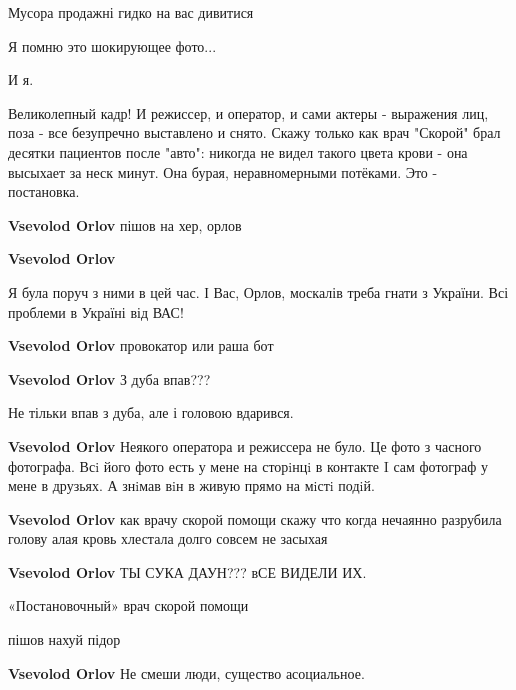 
 
 
 
 

Мусора продажні гидко на вас дивитися

Я помню это шокирующее фото...

И я.


Великолепный кадр! И режиссер, и оператор, и сами актеры - выражения лиц,
поза - все безупречно выставлено и снято. Скажу только как врач "Скорой" брал
десятки пациентов после "авто": никогда не видел такого цвета крови - она
высыхает за неск минут. Она бурая, неравномерными потёками. Это - постановка.

\begin{itemize} %
\textbf{Vsevolod Orlov} пішов на хер, орлов

\textbf{Vsevolod Orlov} 

Я була поруч з ними в цей час. І Вас, Орлов, москалів треба гнати з України.
Всі проблеми в Україні від ВАС!

\textbf{Vsevolod Orlov} провокатор или раша бот

\textbf{Vsevolod Orlov} З дуба впав???

Не тільки впав з дуба, але і головою вдарився.

\textbf{Vsevolod Orlov} Неякого оператора и режиссера не було. Це фото з часного фотографа. Всi його фото есть у мене на сторiнцi в контакте I сам фотограф у мене в друзьях. А знiмав вiн в живую прямо на мiстi подiй.

\textbf{Vsevolod Orlov} как врачу скорой помощи скажу что когда нечаянно разрубила голову алая кровь хлестала долго совсем не засыхая

\textbf{Vsevolod Orlov} ТЫ СУКА ДАУН??? вСЕ ВИДЕЛИ ИХ.

«Постановочный» врач скорой помощи

пішов нахуй підор

\textbf{Vsevolod Orlov}
Не смеши люди, существо асоциальное.
\end{itemize} %

